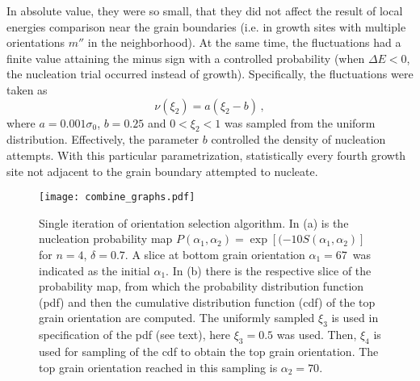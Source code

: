In absolute value, they were so small, that they did not affect the result of local energies comparison near the grain boundaries (i.e. in growth sites with multiple orientations $m''$ in the neighborhood). At the same time, the fluctuations had a finite value attaining the minus sign with a controlled probability (when $\Delta E<0$, the nucleation trial occurred instead of growth). Specifically, the fluctuations were taken as
\begin{equation}
	\nu(\xi_2) = a(\xi_2-b) \,,
\end{equation}
where $a=0.001\sigma_0$, $b=0.25$ and $0<\xi_2<1$ was sampled from the uniform distribution. Effectively, the parameter $b$ controlled the density of nucleation attempts. With this particular parametrization, statistically every fourth growth site not adjacent to the grain boundary attempted to nucleate.

\begin{figure}
	\centering
	\texttt{[image: combine\_graphs.pdf]}
	\caption[Single iteration of orientation selection algorithm]{Single iteration of orientation selection algorithm. In (a) is the nucleation probability map $P(\alpha_1,\alpha_2)=\exp[(-10S(\alpha_1,\alpha_2)]$ for $n=4$, $\delta=0.7$. A slice at bottom grain orientation $\alpha_1=67$\textdegree~was indicated as the initial $\alpha_1$. In (b) there is the respective slice of the probability map, from which the probability distribution function (pdf) and then the cumulative distribution function (cdf) of the top grain orientation are computed. The uniformly sampled $\xi_3$ is used in specification of the pdf (see text), here $\xi_3=0.5$ was used. Then, $\xi_4$ is used for sampling of the cdf to obtain the top grain orientation. The top grain orientation reached in this sampling is $\alpha_2=70$\textdegree.}
	\label{fig_MC_orientation_selection}
\end{figure}

